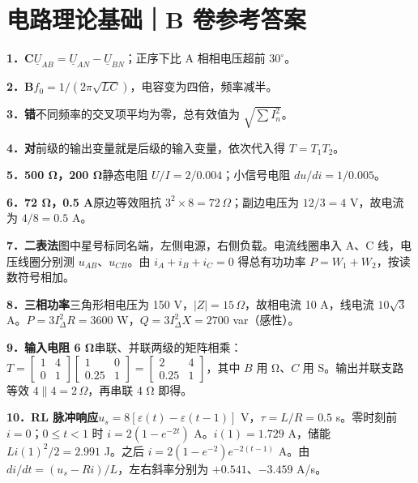 \documentclass[UTF8,zihao=-4]{ctexart}
\newcommand{\ans}[2]{\par\medskip\noindent\textbf{#1}\quad #2\par}
\begin{document}
\section*{电路理论基础｜B 卷参考答案}
\ans{1．C}{$\underline U_{AB}=\underline U_{AN}-\underline U_{BN}$；正序下比 A 相相电压超前 $30^\circ$。}
\ans{2．B}{$f_0=1/(2\pi\sqrt{LC})$，电容变为四倍，频率减半。}
\ans{3．错}{不同频率的交叉项平均为零，总有效值为 $\sqrt{\sum I_n^2}$。}
\ans{4．对}{前级的输出变量就是后级的输入变量，依次代入得 $T=T_1T_2$。}
\ans{5．500 Ω，200 Ω}{静态电阻 $U/I=2/0.004$；小信号电阻 $du/di=1/0.005$。}
\ans{6．72 Ω，0.5 A}{原边等效阻抗 $3^2\times8=72\,\Omega$；副边电压为 $12/3=4$ V，故电流为 $4/8=0.5$ A。}
\ans{7．二表法}{图中星号标同名端，左侧电源，右侧负载。电流线圈串入 A、C 线，电压线圈分别测 $u_{AB}$、$u_{CB}$。由 $i_A+i_B+i_C=0$ 得总有功功率 $P=W_1+W_2$，按读数符号相加。}
\ans{8．三相功率}{三角形相电压为 150 V，$|Z|=15\,\Omega$，故相电流 10 A，线电流 $10\sqrt3$ A。$P=3I_\Delta^2 R=3600$ W，$Q=3I_\Delta^2 X=2700$ var（感性）。}
\ans{9．输入电阻 6 Ω}{串联、并联两级的矩阵相乘：
$T=\begin{bmatrix}1&4\\0&1\end{bmatrix}\begin{bmatrix}1&0\\0.25&1\end{bmatrix}=\begin{bmatrix}2&4\\0.25&1\end{bmatrix}$，其中 $B$ 用 Ω、$C$ 用 S。输出并联支路等效 $4\parallel4=2\,\Omega$，再串联 4 Ω 即得。}
\ans{10．RL 脉冲响应}{$u_s=8[\varepsilon(t)-\varepsilon(t-1)]$ V，$\tau=L/R=0.5$ s。零时刻前 $i=0$；$0\le t<1$ 时 $i=2(1-e^{-2t})$ A。$i(1)=1.729$ A，储能 $Li(1)^2/2=2.991$ J。之后 $i=2(1-e^{-2})e^{-2(t-1)}$ A。由 $di/dt=(u_s-Ri)/L$，左右斜率分别为 $+0.541$、$-3.459$ A/s。}
\newpage
\end{document}
